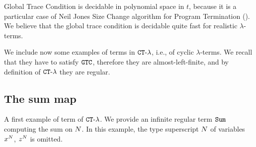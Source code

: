 Global Trace Condition is decidable in polynomial space in $t$, 
because it is a particular case of Neil Jones Size Change algorithm for Program 
Termination (\cite{SCT}). 
We believe that the global trace condition is decidable quite fast
for realistic $\lambda$-terms. 


We include now some examples of  terms in ${ {\tt CT}\mbox{-}\lambda}$, i.e., 
of cyclic $\lambda$-terms. We recall that they have to satisfy ${\tt GTC}$, therefore they are almost-left-finite, and by definition of ${ {\tt CT}\mbox{-}\lambda}$ they are regular.


\subsection{The sum map}

A first example of term of  ${ {\tt CT}\mbox{-}\lambda}$. 
We provide an infinite regular term ${\tt Sum}$ computing the sum on ${N}$.
In this example, the type superscript ${N}$ of variables $x^{N}$, $z^{N}$ is omitted.

